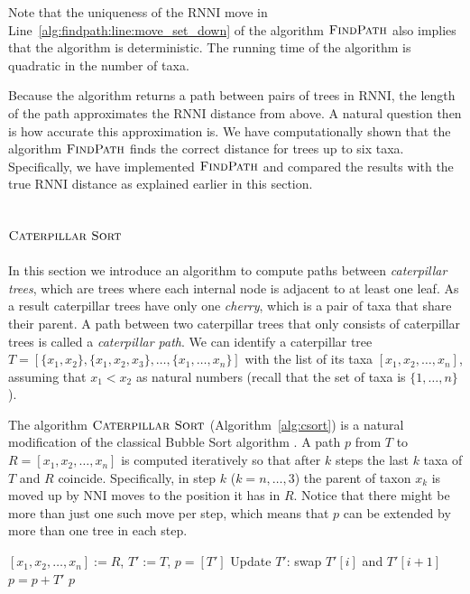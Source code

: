 \documentclass{amsart}
\newcommand{\nni}{\mathrm{NNI}}
\newcommand{\rnni}{\mathrm{RNNI}}
\newcommand{\csort}{\textsc{Caterpillar Sort}}
\newcommand{\findpath}{\textsc{FindPath}}
\begin{document}
Note that the uniqueness of the $\rnni$ move in Line~\ref{alg:findpath:line:move_set_down} of the algorithm $\findpath$ also implies that the algorithm is deterministic.
The running time of the algorithm is quadratic in the number of taxa.

Because the algorithm returns a path between pairs of trees in $\rnni$, the length of the path approximates the $\rnni$ distance from above.
A natural question then is how accurate this approximation is.
We have computationally shown that the algorithm $\findpath$ finds the correct distance for trees up to six taxa.
Specifically, we have implemented $\findpath$ \autocite{Collienne2019} and compared the results with the true $\rnni$ distance as explained earlier in this section.


\subsection{$\csort$}
\label{section:alg_csort}

In this section we introduce an algorithm to compute paths between \emph{caterpillar trees}, which are trees where each internal node is adjacent to at least one leaf.
As a result caterpillar trees have only one \emph{cherry}, which is a pair of taxa that share their parent.
A path between two caterpillar trees that only consists of caterpillar trees is called a \emph{caterpillar path}.
We can identify a caterpillar tree $T = [\{x_1, x_2\}, \{x_1, x_2, x_3\}, \ldots, \{x_1, \ldots, x_n\}]$ with the list of its taxa $[x_1, x_2, \ldots, x_n]$, assuming that $x_1 < x_2$ as natural numbers (recall that the set of taxa is $\{1, \ldots, n\}$).

The algorithm $\csort$ (Algorithm~\ref{alg:csort}) is a natural modification of the classical Bubble Sort algorithm \autocite{Knuth1997-pi}.
A path $p$ from $T$ to $R= [x_1, x_2, \ldots, x_n]$ is computed iteratively so that after $k$ steps the last $k$ taxa of $T$ and $R$ coincide.
Specifically, in step $k$ ($k = n, \ldots, 3$) the parent of taxon $x_{k}$ is moved up by $\nni$ moves to the position it has in $R$.
Notice that there might be more than just one such move per step, which means that $p$ can be extended by more than one tree in each step.

\begin{algorithm}[H]
\caption{$\csort$($T,R$)}
\label{alg:csort}
\begin{algorithmic}[1]
\STATE $[x_1, x_2, \ldots, x_n] := R$, $T' := T$, $p = [T']$
            \STATE Update $T'$: swap $T'[i]$ and $T'[i+1]$
            \STATE $p = p + T'$
        \ENDIF
    \ENDFOR
\ENDFOR
\RETURN $p$
\end{algorithmic}
\end{algorithm}
\end{document}
